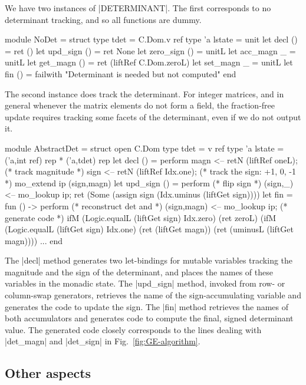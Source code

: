 \documentclass{elsart}
\begin{document}
We have two instances of |DETERMINANT|. The first corresponds to
no determinant tracking, and so all functions are dummy.
\begin{code}
module NoDet = struct
  type tdet = C.Dom.v ref
  type 'a lstate = unit
  let decl ()      = ret ()
  let upd_sign ()  = ret None
  let zero_sign () = unitL
  let acc_magn _   = unitL
  let get_magn ()  = ret (liftRef C.Dom.zeroL)
  let set_magn _   = unitL
  let fin () = failwith "Determinant is needed but not computed"
end
\end{code}

The second instance does track the determinant. For integer matrices,
and in general whenever the matrix elements do not form a field, 
the fraction-free update requires tracking some facets of the
determinant, even if we do not output it.
\begin{code}
module AbstractDet = struct
  open C.Dom
  type tdet = v ref
  type 'a lstate = ('a,int ref) rep * ('a,tdet) rep
  let decl () = perform
      magn <-- retN (liftRef oneL);    (* track magnitude *)
      sign <-- retN (liftRef Idx.one); (* track the sign: +1, 0, -1 *)
      mo_extend ip (sign,magn)
  let upd_sign () = perform            (* flip sign *)
      (sign,_) <-- mo_lookup ip;
      ret (Some (assign sign (Idx.uminus (liftGet sign))))
  let fin = fun () -> perform          (* reconstruct det and *)
      (sign,magn) <-- mo_lookup ip;    (* generate code       *)
      ifM (Logic.equalL (liftGet sign) Idx.zero) (ret zeroL)
      (ifM (Logic.equalL (liftGet sign) Idx.one) (ret (liftGet magn))
          (ret (uminusL (liftGet magn))))
  ...
end
\end{code}
The |decl| method generates two let-bindings for mutable variables
tracking the magnitude and the sign of the determinant, and places the
names of these variables in the monadic state. The |upd_sign| method,
invoked from row- or column-swap generators, retrieves the name of the
sign-accumulating variable and generates the code to update the
sign. The |fin| method retrieves the names of both accumulators and
generates code to compute the final, signed determinant value.  The
generated code closely corresponds to the lines dealing with
|det_magn| and |det_sign| in Fig.~\ref{fig:GE-algorithm}.

\subsection{Other aspects}
\end{document}
